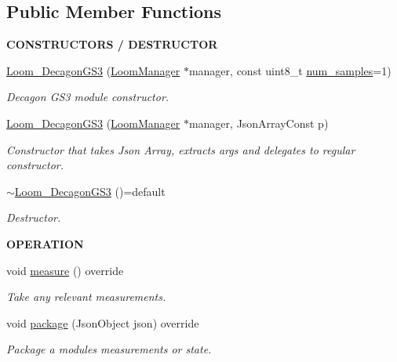 \subsection*{Public Member Functions}
\begin{Indent}{\bf C\+O\+N\+S\+T\+R\+U\+C\+T\+O\+RS / D\+E\+S\+T\+R\+U\+C\+T\+OR}\par
\begin{DoxyCompactItemize}
\item 
\hyperlink{class_loom___decagon_g_s3_a1e9aa9e2f05d497830bc263152107f4a}{Loom\+\_\+\+Decagon\+G\+S3} (\hyperlink{class_loom_manager}{Loom\+Manager} $\ast$manager, const uint8\+\_\+t \hyperlink{class_loom_sensor_a0e74ebbaecde15ed1c71e1bb6bc6aebe}{num\+\_\+samples}=1)
\begin{DoxyCompactList}\small\item\em Decagon G\+S3 module constructor. \end{DoxyCompactList}\item 
\hyperlink{class_loom___decagon_g_s3_a4a21f57dc28223d45e0a3bf128fa15a8}{Loom\+\_\+\+Decagon\+G\+S3} (\hyperlink{class_loom_manager}{Loom\+Manager} $\ast$manager, Json\+Array\+Const p)
\begin{DoxyCompactList}\small\item\em Constructor that takes Json Array, extracts args and delegates to regular constructor. \end{DoxyCompactList}\item 
\hyperlink{class_loom___decagon_g_s3_aa660a154dca3ecb397a67ddd989e8382}{$\sim$\+Loom\+\_\+\+Decagon\+G\+S3} ()=default
\begin{DoxyCompactList}\small\item\em Destructor. \end{DoxyCompactList}\end{DoxyCompactItemize}
\end{Indent}
\begin{Indent}{\bf O\+P\+E\+R\+A\+T\+I\+ON}\par
\begin{DoxyCompactItemize}
\item 
void \hyperlink{class_loom___decagon_g_s3_a355b3ff5a69506a015e77acbaae30c9b}{measure} () override
\begin{DoxyCompactList}\small\item\em Take any relevant measurements. \end{DoxyCompactList}\item 
void \hyperlink{class_loom___decagon_g_s3_a48b54dffb09f83a82e9ebed32e1c7152}{package} (Json\+Object json) override
\begin{DoxyCompactList}\small\item\em Package a modules measurements or state. \end{DoxyCompactList}\end{DoxyCompactItemize}
\end{Indent}
